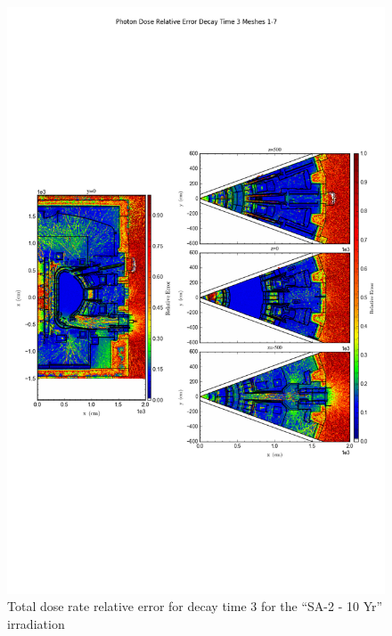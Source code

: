 \documentclass[12pt]{article}
\begin{document}
\begin{figure}[ht!]
\centering
\includegraphics[trim={0cm 8cm, 0cm 8cm},clip,scale=0.75]{../plots/final_model_with_b4c/5year/Photon_Dose_Relative_Error_Decay_Time_3_Meshes_1-7.png}
\caption{Total dose rate relative error for decay time 3 for the ``SA-2 - 10 Yr'' irradiation}
\label{fig:photons_5y_dc3_b4c_relerr}
\end{figure}
\clearpage
\newpage
\end{document}
